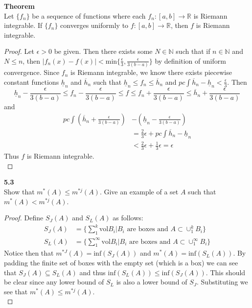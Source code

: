 \documentclass[12pt]{article}
\newcommand{\problem}[1]{\hspace{-4 ex} \large \textbf{#1}\\}
\begin{document}
	\textbf{Theorem}\\
	Let $\{f_n\}$ be a sequence of functions where each $f_n:[a,b] \to \mathbb{R}$ is Riemann integrable. If $\{f_n\}$ converges uniformly to $f:[a,b] \to \mathbb{R}$, then $f$ is Riemann integrable.
	\begin{proof}
		Let $\epsilon > 0$ be given. Then there exists some $N \in \mathbb{N}$ such that if $n \in \mathbb{N}$ and $N \leq n$, then $\vert f_n(x) - f(x) \vert < \text{min}\Big\{\frac{\epsilon}{3}, \frac{\epsilon}{3(b-a)}\Big\}$ by definition of uniform convergence. Since $f_n$ is Riemann integrable, we know there exists piecewise constant functions $\underline{h}_n$ and $\overline{h}_n$ such that $\underline{h}_n \leq f_n \leq \overline{h}_n$ and $\textit{pc}\int \overline{h}_n - \underline{h}_n < \frac{\epsilon}{3}$. Then
		$$
		\underline{h}_n - \frac{\epsilon}{3(b-a)} \leq f_n - \frac{\epsilon}{3(b-a)} \leq f \leq f_n + \frac{\epsilon}{3(b-a)} \leq \overline{h}_n +\frac{\epsilon}{3(b-a)}
		$$
		and 
		\begin{align*}
			\textit{pc}\int (\overline{h}_n +\frac{\epsilon}{3(b-a)}) & - (\underline{h}_n - \frac{\epsilon}{3(b-a)}) \\
			& = \frac{2}{3}\epsilon + \textit{pc}\int \overline{h}_n - \underline{h}_n \\
			& < \frac{2}{3}\epsilon + \frac{1}{3}\epsilon = \epsilon
		\end{align*}
		Thus $f$ is Riemann integrable.\\
	\end{proof}



\problem{5.3} Show that $m^*(A)\leq m^{*j}(A)$. Give an example of a set $A$ such that $m^*(A)<m^{*j}(A)$.
	
	\begin{proof}
		Define $S_J(A)$ and $S_L(A)$ as follows:
		\begin{align*}
			S_J(A) & = \Bigg\{\sum_1^k\text{vol}B_i \Bigg \vert B_i \text{ are boxes and } A \subset \cup_1^k B_i \Bigg\} \\
			S_L(A) & = \Bigg\{\sum_1^\infty\text{vol}B_i \Bigg \vert B_i \text{ are boxes and } A \subset \cup_1^\infty B_i \Bigg\}
		\end{align*}
	Notice then that $m^{*J}(A) = \text{inf}(S_J(A))$ and $m^{*}(A) = \text{inf}(S_L(A))$. By padding the finite set of boxes with the empty set (which is a box) we can see that $S_J(A) \subseteq S_L(A)$ and thus $\text{inf}(S_L(A)) \leq \text{inf}(S_J(A))$. This should be clear since any lower bound of $S_L$ is also a lower bound of $S_J$. Substituting we see that $m^*(A)\leq m^{*j}(A)$. \\
	\end{proof}
	
\end{document}
